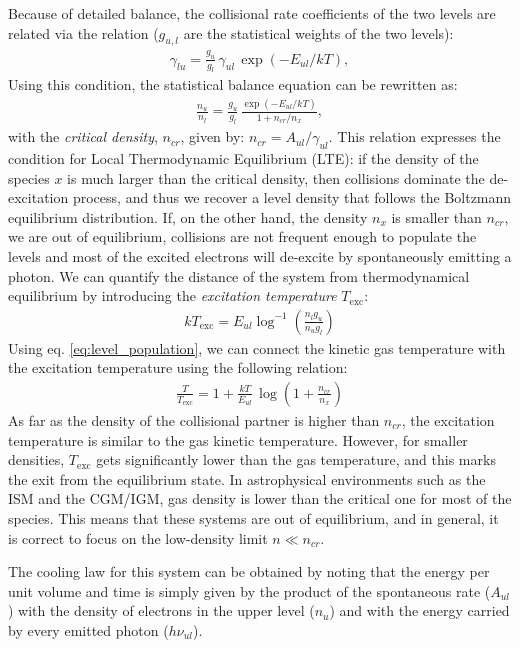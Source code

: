 Because of detailed balance, the collisional rate coefficients of the two levels are
related via the relation ($g_{u,l}$ are the statistical weights of the two levels):
\begin{align}
    \gamma_{lu} = \frac{g_u}{g_l} \,\gamma_{ul}\,\exp(-E_{ul}/kT), \label{eq:coll_rates}
\end{align}
Using this condition, the statistical balance equation can be rewritten as:
\begin{align}
    \frac{n_u}{n_l} = \frac{g_u}{g_l}\,\frac{\exp(-E_{ul}/kT)}{1+n_{cr}/n_x}, \label{eq:level_population}
\end{align}
with the \textit{critical density}, $n_{cr}$, given by: $n_{cr} = A_{ul}/\gamma_{ul}$. This relation expresses the condition for Local Thermodynamic Equilibrium (LTE): if the density of the species $x$ is much larger than the critical density, then collisions dominate the de-excitation process, and thus we recover a level density that follows the Boltzmann equilibrium distribution. If, on the other hand, the density $n_x$ is smaller than $n_{cr}$, we are out of equilibrium, collisions are not frequent enough to populate the levels and most of the excited electrons will de-excite by spontaneously emitting a photon. We can quantify the distance of the system from thermodynamical equilibrium by introducing the \textit{excitation temperature} $T_\mathrm{exc}$:
\begin{align}
    kT_\mathrm{exc} = E_{ul}\log^{-1}\left(\frac{n_lg_u}{n_ug_l}\right) \label{eq:t_exc}
\end{align}
Using eq. \ref{eq:level_population}, we can connect the kinetic gas temperature with the excitation temperature using the following relation: 
\begin{align}
    \frac{T}{T_\mathrm{exc}} = 1 + \frac{kT}{E_{ul}}\, \log\left(1+\frac{n_{cr}}{n_x}\right)
\end{align}
As far as the density of the collisional partner is higher than $n_{cr}$, the excitation temperature is similar to the gas kinetic temperature. However, for smaller densities, $T_\mathrm{exc}$ gets significantly lower than the gas temperature, and this marks the exit from the equilibrium state. In astrophysical environments such as the ISM and the CGM/IGM, gas density is lower than the critical one for most of the species. This means that these systems are out of equilibrium, and in general, it is correct to focus on the low-density limit $n\ll n_{cr}$. 

The cooling law for this system can be obtained by noting that the energy per unit volume and time is simply given by the product of the spontaneous rate ($A_{ul}$) with the density of electrons in the upper level ($n_u$) and with the energy carried by every emitted photon ($h\nu_{ul}$). 

